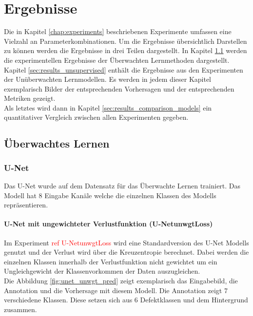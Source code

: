 
\chapter{Ergebnisse}
\label{chap:results}

Die in Kapitel \ref{chap:experiments} beschriebenen Experimente umfassen eine Vielzahl an Parameterkombinationen. Um die Ergebnisse übersichtlich Darstellen zu können werden die Ergebnisse in drei Teilen dargestellt. In Kapitel \ref{sec:results_supervised} werden die experimentellen Ergebnisse der Überwachten Lernmethoden dargestellt. Kapitel \ref{sec:results_unsupervised} enthält die Ergebnisse aus den Experimenten der Unüberwachten Lernmodellen. Es werden in jedem dieser Kapitel exemplarisch Bilder der entsprechenden Vorhersagen und der entsprechenden Metriken gezeigt.\\
Als letztes wird dann in Kapitel \ref{sec:results_comparison_models} ein quantitativer Vergleich zwischen allen Experimenten gegeben. 


\section{Überwachtes Lernen}
\label{sec:results_supervised}
  \subsection{U-Net}
  Das U-Net wurde auf dem Datensatz für das Überwachte Lernen trainiert. Das Modell hat 8 Eingabe Kanäle welche die einzelnen Klassen des Modells repräsentieren.
  \subsubsection*{U-Net mit ungewichteter Verlustfunktion (U-Net\textunderscore unwgtLoss)}
  Im Experiment \textcolor{red}{ref U-Net\textunderscore unwgtLoss} wird eine Standardversion des U-Net Modells genutzt und der Verlust wird über die Kreuzentropie berechnet. Dabei werden die einzelnen Klassen innerhalb der Verlustfunktion nicht gewichtet um ein Ungleichgewicht der Klassenvorkommen der Daten auszugleichen.\\
  Die Abbildung \ref{fig:unet_unwgt_pred} zeigt exemplarisch das Eingabebild, die Annotation und die Vorhersage mit diesem Modell. Die Annotation zeigt 7 verschiedene Klassen. Diese setzen sich aus 6 Defektklassen und dem Hintergrund zusammen.\\ 


